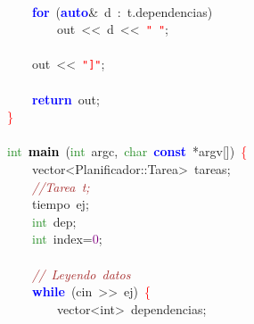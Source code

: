 \mbox{} \\
\mbox{}\ \ \ \ \textbf{\textcolor{Blue}{for}}\ \textcolor{BrickRed}{(}\textbf{\textcolor{Blue}{auto}}\textcolor{BrickRed}{\&}\ d\ \textcolor{BrickRed}{:}\ t\textcolor{BrickRed}{.}dependencias\textcolor{BrickRed}{)} \\
\mbox{}\ \ \ \ \ \ \ \ out\ \textcolor{BrickRed}{\textless{}\textless{}}\ d\ \textcolor{BrickRed}{\textless{}\textless{}}\ \texttt{\textcolor{Red}{"{}\ "{}}}\textcolor{BrickRed}{;} \\
\mbox{} \\
\mbox{}\ \ \ \ out\ \textcolor{BrickRed}{\textless{}\textless{}}\ \texttt{\textcolor{Red}{"{}]"{}}}\textcolor{BrickRed}{;} \\
\mbox{} \\
\mbox{}\ \ \ \ \textbf{\textcolor{Blue}{return}}\ out\textcolor{BrickRed}{;} \\
\mbox{}\textcolor{Red}{\}} \\
\mbox{} \\
\mbox{}\textcolor{ForestGreen}{int}\ \textbf{\textcolor{Black}{main}}\ \textcolor{BrickRed}{(}\textcolor{ForestGreen}{int}\ argc\textcolor{BrickRed}{,}\ \textcolor{ForestGreen}{char}\ \textbf{\textcolor{Blue}{const}}\ \textcolor{BrickRed}{*}argv\textcolor{BrickRed}{[])}\ \textcolor{Red}{\{} \\
\mbox{}\ \ \ \ \textcolor{TealBlue}{vector\textless{}Planificador::Tarea\textgreater{}}\ tareas\textcolor{BrickRed}{;} \\
\mbox{}\ \ \ \ \textit{\textcolor{Brown}{//Tarea\ t;}} \\
\mbox{}\ \ \ \ \textcolor{TealBlue}{tiempo}\ ej\textcolor{BrickRed}{;} \\
\mbox{}\ \ \ \ \textcolor{ForestGreen}{int}\ dep\textcolor{BrickRed}{;} \\
\mbox{}\ \ \ \ \textcolor{ForestGreen}{int}\ index\textcolor{BrickRed}{=}\textcolor{Purple}{0}\textcolor{BrickRed}{;} \\
\mbox{} \\
\mbox{}\ \ \ \ \textit{\textcolor{Brown}{//\ Leyendo\ datos}} \\
\mbox{}\ \ \ \ \textbf{\textcolor{Blue}{while}}\ \textcolor{BrickRed}{(}cin\ \textcolor{BrickRed}{\textgreater{}\textgreater{}}\ ej\textcolor{BrickRed}{)}\ \textcolor{Red}{\{} \\
\mbox{}\ \ \ \ \ \ \ \ \textcolor{TealBlue}{vector\textless{}int\textgreater{}}\ dependencias\textcolor{BrickRed}{;} \\
\mbox{} \\
